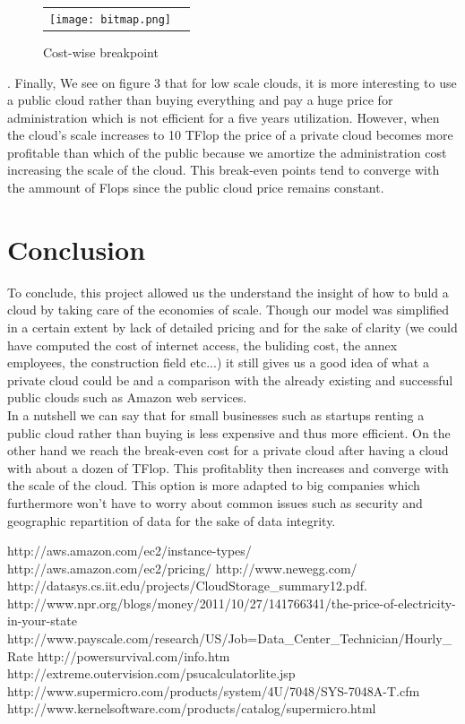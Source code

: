 \documentclass[12pt,journal, a4paper]{IEEEtran}
\begin{document}
\begin{figure}[h!]
\centering
\captionsetup{justification=centering}
\begin{tabular}{cc}
\texttt{[image: bitmap.png]}
\end{tabular}
\caption{Cost-wise breakpoint}
\end{figure}

\newpage
.\newpage
Finally, We see on figure 3 that for low scale clouds, it is more interesting to use a public cloud rather than buying everything and pay a huge price for administration which is not efficient for a five years utilization. However, when the cloud's scale increases to 10 TFlop the price of a private cloud becomes more profitable than which of the public because we amortize the administration cost increasing the scale of the cloud. This break-even points tend to converge with the ammount of Flops since the public cloud price remains constant.

\section{Conclusion}
To conclude, this project allowed us the understand the insight of how to buld a cloud by taking care of the economies of scale. Though our model was simplified in a certain extent by lack of detailed pricing and for the sake of clarity (we could have computed the cost of internet access, the buliding cost, the annex employees, the construction field etc...) it still gives us a good idea of what a private cloud could be and a comparison with the already existing and successful public clouds such as Amazon web services. \\

In a nutshell we can say that for small businesses such as startups renting a public cloud rather than buying is less expensive and thus more efficient. On the other hand we reach the break-even cost for a private cloud after having a cloud with about a dozen of TFlop. This profitablity then increases and converge with the scale of the cloud. This option is more adapted to big companies which furthermore won't have to worry about common issues such as security and geographic repartition of data for the sake of data integrity. 
\begin{thebibliography}{5}

http://aws.amazon.com/ec2/instance-types/
http://aws.amazon.com/ec2/pricing/
http://www.newegg.com/
http://datasys.cs.iit.edu/projects/CloudStorage\_summary12.pdf.
http://www.npr.org/blogs/money/2011/10/27/141766341/the-price-of-electricity-in-your-state
http://www.payscale.com/research/US/Job=Data\_Center\_Technician/Hourly\_Rate
http://powersurvival.com/info.htm
http://extreme.outervision.com/psucalculatorlite.jsp
http://www.supermicro.com/products/system/4U/7048/SYS-7048A-T.cfm
http://www.kernelsoftware.com/products/catalog/supermicro.html
\end{thebibliography}

\end{document}
